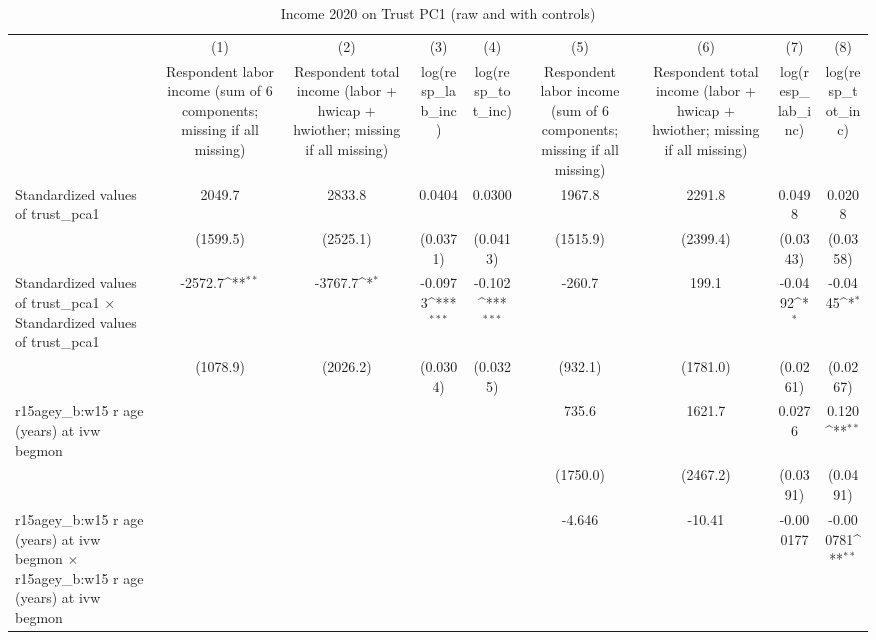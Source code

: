 \begin{table}[htbp]\centering
\def\sym#1{\ifmmode^{#1}\else\(^{#1}\)\fi}
\caption{Income 2020 on Trust PC1 (raw and with controls)}
\begin{tabular}{l*{8}{c}}
\toprule
                &\multicolumn{1}{c}{(1)}&\multicolumn{1}{c}{(2)}&\multicolumn{1}{c}{(3)}&\multicolumn{1}{c}{(4)}&\multicolumn{1}{c}{(5)}&\multicolumn{1}{c}{(6)}&\multicolumn{1}{c}{(7)}&\multicolumn{1}{c}{(8)}\\
                &\multicolumn{1}{c}{Respondent labor income (sum of 6 components; missing if all missing)}&\multicolumn{1}{c}{Respondent total income (labor + hwicap + hwiother; missing if all missing)}&\multicolumn{1}{c}{log(resp\_lab\_inc)}&\multicolumn{1}{c}{log(resp\_tot\_inc)}&\multicolumn{1}{c}{Respondent labor income (sum of 6 components; missing if all missing)}&\multicolumn{1}{c}{Respondent total income (labor + hwicap + hwiother; missing if all missing)}&\multicolumn{1}{c}{log(resp\_lab\_inc)}&\multicolumn{1}{c}{log(resp\_tot\_inc)}\\
\midrule
Standardized values of trust\_pca1&   2049.7         &   2833.8         &   0.0404         &   0.0300         &   1967.8         &   2291.8         &   0.0498         &   0.0208         \\
                & (1599.5)         & (2525.1)         & (0.0371)         & (0.0413)         & (1515.9)         & (2399.4)         & (0.0343)         & (0.0358)         \\
\addlinespace
Standardized values of trust\_pca1 $\times$ Standardized values of trust\_pca1&  -2572.7\sym{**} &  -3767.7\sym{*}  &  -0.0973\sym{***}&   -0.102\sym{***}&   -260.7         &    199.1         &  -0.0492\sym{*}  &  -0.0445\sym{*}  \\
                & (1078.9)         & (2026.2)         & (0.0304)         & (0.0325)         &  (932.1)         & (1781.0)         & (0.0261)         & (0.0267)         \\
\addlinespace
r15agey\_b:w15 r age (years) at ivw begmon&                  &                  &                  &                  &    735.6         &   1621.7         &   0.0276         &    0.120\sym{**} \\
                &                  &                  &                  &                  & (1750.0)         & (2467.2)         & (0.0391)         & (0.0491)         \\
\addlinespace
r15agey\_b:w15 r age (years) at ivw begmon $\times$ r15agey\_b:w15 r age (years) at ivw begmon&                  &                  &                  &                  &   -4.646         &   -10.41         &-0.000177         &-0.000781\sym{**} \\

\end{tabular}
\end{table}
